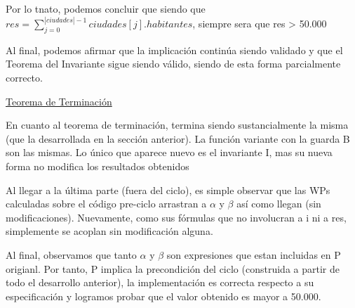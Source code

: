 \documentclass[10pt,a4paper]{article}
\begin{document}
\begin {enumerate}
    Por lo tnato, podemos concluir que siendo que $res = \sum\limits^{|ciudades|- 1}_{j = 0}{ciudades[j].habitantes}$, siempre sera que res > 50.000
    
    Al final, podemos afirmar que la implicación continúa siendo validado y que el Teorema del Invariante sigue siendo válido, siendo de esta forma parcialmente correcto. 

    \underline{Teorema de Terminación}

    En cuanto al teorema de terminación, termina siendo sustancialmente la misma (que la desarrollada en la sección anterior). La función 
    variante con la guarda B son las mismas. Lo único que aparece nuevo es el invariante I, mas su nueva forma no modifica los resultados obtenidos

    Al llegar a la última parte (fuera del ciclo), es simple observar que las WPs calculadas sobre el código pre-ciclo arrastran a $\alpha$ y $\beta$ así como llegan
    (sin modificaciones). Nuevamente, como sus fórmulas que no involucran a i ni a res, simplemente se acoplan sin modificación alguna.

    Al final, observamos que tanto $\alpha$ y $\beta$ son expresiones que estan incluidas en P origianl. Por tanto, P implica la precondición
    del ciclo (construida a partir de todo el desarrollo anterior), la implementación es correcta respecto a su especificación y logramos 
    probar que el valor obtenido es mayor a 50.000.






\end{enumerate}
\end{document}

